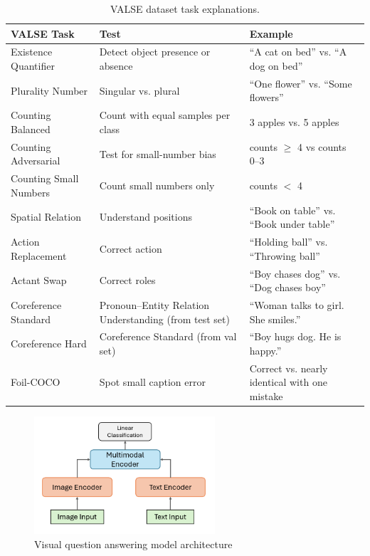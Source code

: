 \begin{table}[h]
    \caption{VALSE dataset task explanations.}
    \label{tab:valse_detail}
    \centering
    \begin{tabular}{|l|p{4cm}|p{5cm}|}
        \hline
        \textbf{VALSE Task} & \textbf{Test} & \textbf{Example} \\ \hline
        Existence Quantifier & Detect object presence or absence & ``A cat on bed'' vs. ``A dog on bed'' \\ \hline
        Plurality Number & Singular vs. plural & ``One flower'' vs. ``Some flowers'' \\ \hline
        Counting Balanced & Count with equal samples per class & 3 apples vs. 5 apples \\ \hline
        Counting Adversarial & Test for small-number bias & counts $\ge$ 4 vs counts 0–3 \\ \hline
        Counting Small Numbers & Count small numbers only & counts $<$ 4 \\ \hline
        Spatial Relation & Understand positions & ``Book on table'' vs. ``Book under table'' \\ \hline
        Action Replacement & Correct action & ``Holding ball'' vs. ``Throwing ball'' \\ \hline
        Actant Swap & Correct roles & ``Boy chases dog'' vs. ``Dog chases boy'' \\ \hline
        Coreference Standard & Pronoun–Entity Relation Understanding (from test set) & ``Woman talks to girl. She smiles.'' \\ \hline
        Coreference Hard & Coreference Standard (from val set) & ``Boy hugs dog. He is happy.'' \\ \hline
        Foil-COCO & Spot small caption error & Correct vs. nearly identical with one mistake \\ \hline
    \end{tabular}
\end{table}

\begin{figure}[h]
    \caption{Visual question answering model architecture}
    \label{fig:vqa}
    \begin{center}
        \includegraphics[width=0.6\textwidth]{Images/vqa_method.png}
    \end{center}
    \small
\end{figure}


